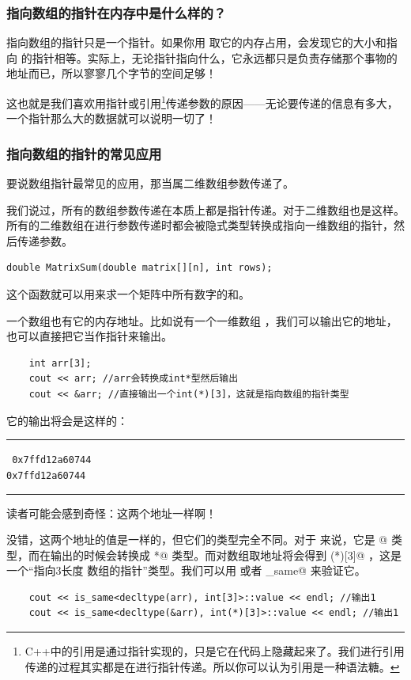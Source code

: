 \subsubsection*{指向数组的指针在内存中是什么样的？}
指向数组的指针只是一个指针。如果你用 \lstinline@sizeof@ 取它的内存占用，会发现它的大小和指向 \lstinline@int@ 的指针相等。实际上，无论指针指向什么，它永远都只是负责存储那个事物的地址而已，所以寥寥几个字节的空间足够！\par
这也就是我们喜欢用指针或引用\footnote{C++中的引用是通过指针实现的，只是它在代码上隐藏起来了。我们进行引用传递的过程其实都是在进行指针传递。所以你可以认为引用是一种语法糖。}传递参数的原因——无论要传递的信息有多大，一个指针那么大的数据就可以说明一切了！\par
\subsubsection*{指向数组的指针的常见应用}
要说数组指针最常见的应用，那当属二维数组参数传递了。\par
我们说过，所有的数组参数传递在本质上都是指针传递。对于二维数组也是这样。所有的二维数组在进行参数传递时都会被隐式类型转换成指向一维数组的指针，然后传递参数。
\begin{lstlisting}
double MatrixSum(double matrix[][n], int rows);
\end{lstlisting}
这个函数就可以用来求一个矩阵中所有数字的和。\par
一个数组也有它的内存地址。比如说有一个一维数组 \lstinline@arr@，我们可以输出它的地址，也可以直接把它当作指针来输出。
\begin{lstlisting}
    int arr[3];
    cout << arr; //arr会转换成int*型然后输出
    cout << &arr; //直接输出一个int(*)[3]，这就是指向数组的指针类型
\end{lstlisting}
它的输出将会是这样的：\\\noindent\rule{\linewidth}{.2pt}\texttt{
0x7ffd12a60744\\
0x7ffd12a60744
}\\\noindent\rule{\linewidth}{.2pt}\par
读者可能会感到奇怪：这两个地址一样啊！\par
没错，这两个地址的值是一样的，但它们的类型完全不同。对于 \lstinline@arr@ 来说，它是 \lstinline@int[3]@ 类型，而在输出的时候会转换成 \lstinline@*@ 类型。而对数组取地址将会得到 \lstinline@int(*)[3]@ ，这是一个``指向3长度 \lstinline@int@ 数组的指针''类型。我们可以用 \lstinline@typeid@ 或者 \lstinline@is_same@ 来验证它。
\begin{lstlisting}
    cout << is_same<decltype(arr), int[3]>::value << endl; //输出1
    cout << is_same<decltype(&arr), int(*)[3]>::value << endl; //输出1
\end{lstlisting}\par
